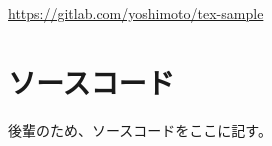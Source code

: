 \documentclass[a4j,openany,11px]{jsbook}
\begin{document}
\listoftables %

\listoffigures %

\begin{thebibliography}{99}
    \url{https://gitlab.com/yoshimoto/tex-sample}
\end{thebibliography}

\appendix
\chapter{ソースコード}
後輩のため、ソースコードをここに記す。

\end{document}
